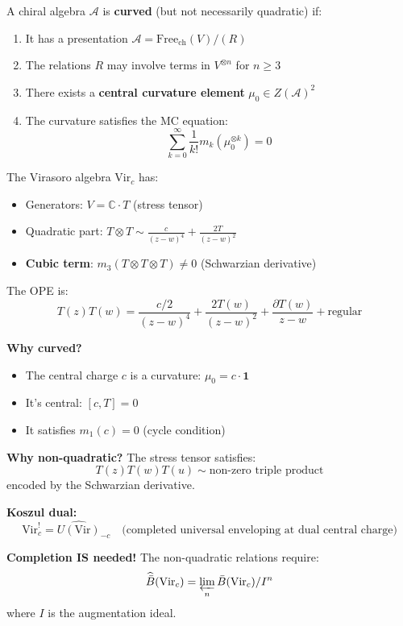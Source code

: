 \begin{definition}\label{def:curved-chiral-detailed}
A chiral algebra $\mathcal{A}$ is \textbf{curved} (but not necessarily quadratic) if:
\begin{enumerate}
\item It has a presentation $\mathcal{A} = \text{Free}_{\text{ch}}(V) / (R)$
\item The relations $R$ may involve terms in $V^{\otimes n}$ for $n \geq 3$
\item There exists a \textbf{central curvature element} $\mu_0 \in Z(\mathcal{A})^2$
\item The curvature satisfies the MC equation: 
$$\sum_{k=0}^\infty \frac{1}{k!} m_k(\mu_0^{\otimes k}) = 0$$
\end{enumerate}
\end{definition}

\begin{example}\label{ex:virasoro-curved}
The Virasoro algebra $\text{Vir}_c$ has:
\begin{itemize}
\item Generators: $V = \mathbb{C} \cdot T$ (stress tensor)
\item Quadratic part: $T \otimes T \sim \frac{c}{(z-w)^4} + \frac{2T}{(z-w)^2}$
\item \textbf{Cubic term}: $m_3(T \otimes T \otimes T) \neq 0$ (Schwarzian derivative)
\end{itemize}

The OPE is:
$$T(z)T(w) = \frac{c/2}{(z-w)^4} + \frac{2T(w)}{(z-w)^2} + \frac{\partial T(w)}{z-w} + \text{regular}$$

\textbf{Why curved?}
\begin{itemize}
\item The central charge $c$ is a curvature: $\mu_0 = c \cdot \mathbf{1}$
\item It's central: $[c, T] = 0$
\item It satisfies $m_1(c) = 0$ (cycle condition)
\end{itemize}

\textbf{Why non-quadratic?}
The stress tensor satisfies:
$$T(z)T(w)T(u) \sim \text{non-zero triple product}$$
encoded by the Schwarzian derivative.

\textbf{Koszul dual:}
$$\text{Vir}_c^! = \widehat{U(\text{Vir})}_{-c} 
\quad \text{(completed universal enveloping at dual central charge)}$$

\textbf{Completion IS needed!} The non-quadratic relations require:
$$\widehat{\bar{B}}(\text{Vir}_c) = \varprojlim_n \bar{B}(\text{Vir}_c)/I^n$$
where $I$ is the augmentation ideal.
\end{example}

